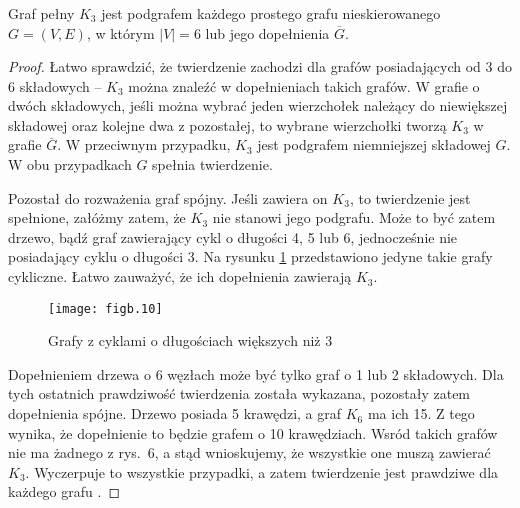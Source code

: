 \subsubsection{} %
\begin{twierdzenie*}
	Graf pełny $K_3$ jest podgrafem każdego prostego grafu nieskierowanego $G=(V,E)$, w którym $|V|=6$ lub jego dopełnienia $\overline{G}$.
\end{twierdzenie*}
\begin{proof}
Łatwo sprawdzić, że twierdzenie zachodzi dla grafów posiadających od 3 do 6 składowych -- $K_3$ można znaleźć w dopełnieniach takich grafów. W grafie o dwóch składowych, jeśli można wybrać jeden wierzchołek należący do niewiększej składowej oraz kolejne dwa z pozostałej, to wybrane wierzchołki tworzą $K_3$ w grafie $\overline{G}$. W przeciwnym przypadku, $K_3$ jest podgrafem niemniejszej składowej $G$. W obu przypadkach $G$ spełnia twierdzenie.

Pozostał do rozważenia graf spójny. Jeśli zawiera on $K_3$, to twierdzenie jest spełnione, załóżmy zatem, że $K_3$ nie stanowi jego podgrafu. Może to być zatem drzewo, bądź graf zawierający cykl o długości 4, 5 lub 6, jednocześnie nie posiadający cyklu o długości 3. Na rysunku \ref{fig:B-2(b)} przedstawiono jedyne takie grafy cykliczne. Łatwo zauważyć, że ich dopełnienia zawierają $K_3$.
\begin{figure}[ht]
	\begin{center}
		\texttt{[image: figb.10]}
	\end{center}
	\caption{Grafy z cyklami o długościach większych niż 3} \label{fig:B-2(b)}
\end{figure}
Dopełnieniem drzewa o 6 węzłach może być tylko graf o 1 lub 2 składowych. Dla tych ostatnich prawdziwość twierdzenia została wykazana, pozostały zatem dopełnienia spójne. Drzewo  posiada 5 krawędzi, a graf $K_6$ ma ich 15. Z tego wynika, że dopełnienie to będzie grafem o 10 krawędziach. Wsród takich grafów nie ma żadnego z rys.~6, a stąd wnioskujemy, że wszystkie one muszą zawierać $K_3$. Wyczerpuje to wszystkie przypadki, a zatem twierdzenie jest prawdziwe dla każdego grafu .

\end{proof}

